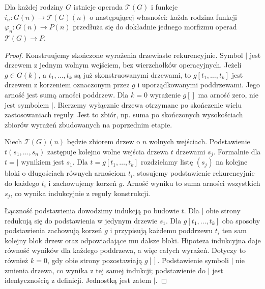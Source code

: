 \begin{twierdzenie}\label{cat:thm:free-ns-operad}
Dla każdej rodziny $G$ istnieje operada $\mathcal T(G)$ i funkcje $i_n:G(n)\to\mathcal T(G)(n)$ o następującej własności: każda rodzina funkcji $\varphi_n:G(n)\to P(n)$ przedłuża się do dokładnie jednego morfizmu operad $\mathcal T(G)\to P$.
\end{twierdzenie}
\begin{proof}
Konstruujemy skończone wyrażenia drzewiaste rekurencyjnie. Symbol $\vert$ jest drzewem z jednym wolnym wejściem, bez wierzchołków operacyjnych. Jeżeli $g\in G(k)$, a $t_1,\ldots,t_k$ są już skonstruowanymi drzewami, to $g[t_1,\ldots,t_k]$ jest drzewem z korzeniem oznaczonym przez $g$ i uporządkowanymi poddrzewami. Jego arność jest sumą arności poddrzew. Dla $k=0$ wyrażenie $g[]$ ma arność zero, nie jest symbolem $\vert$. Bierzemy wyłącznie drzewa otrzymane po skończenie wielu zastosowaniach reguły. Jest to zbiór, np. suma po skończonych wysokościach zbiorów wyrażeń zbudowanych na poprzednim etapie.

Niech $\mathcal T(G)(n)$ będzie zbiorem drzew o $n$ wolnych wejściach. Podstawienie $t(s_1,\ldots,s_n)$ zastępuje kolejno wolne wejścia drzewa $t$ drzewami $s_j$. Formalnie dla $t=\vert$ wynikiem jest $s_1$. Dla $t=g[t_1,\ldots,t_k]$ rozdzielamy listę $(s_j)$ na kolejne bloki o długościach równych arnościom $t_i$, stosujemy podstawienie rekurencyjnie do każdego $t_i$ i zachowujemy korzeń $g$. Arność wyniku to suma arności wszystkich $s_j$, co wynika indukcyjnie z reguły konstrukcji.

Łączność podstawienia dowodzimy indukcją po budowie $t$. Dla $\vert$ obie strony redukują się do podstawienia w jedynym drzewie $s_1$. Dla $g[t_1,\ldots,t_k]$ oba sposoby podstawienia zachowują korzeń $g$ i przypisują każdemu poddrzewu $t_i$ ten sam kolejny blok drzew oraz odpowiadające mu dalsze bloki. Hipoteza indukcyjna daje równość wyników dla każdego poddrzewa, a więc całych wyrażeń. Dotyczy to również $k=0$, gdy obie strony pozostawiają $g[]$. Podstawienie symboli $\vert$ nie zmienia drzewa, co wynika z tej samej indukcji; podstawienie do $\vert$ jest identycznością z definicji. Jednostką jest zatem $\vert$.


\end{proof}

